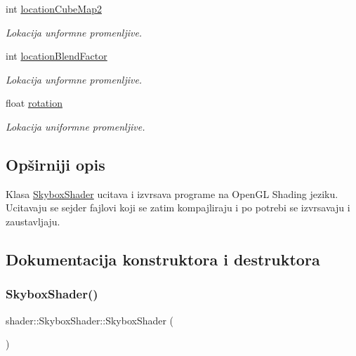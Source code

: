 \begin{DoxyCompactItemize}
int \hyperlink{classshader_1_1SkyboxShader_a011fc4476645aae62b9ae6e64faead3a}{location\+Cube\+Map2}
\begin{DoxyCompactList}\small\item\em Lokacija unformne promenljive. \end{DoxyCompactList}\item 
int \hyperlink{classshader_1_1SkyboxShader_a5f21030a22bd04c0b5a3018d5175b881}{location\+Blend\+Factor}
\begin{DoxyCompactList}\small\item\em Lokacija unformne promenljive. \end{DoxyCompactList}\item 
float \hyperlink{classshader_1_1SkyboxShader_a9e6ac7d8bed0467c3aa3b77f0fe80401}{rotation}
\begin{DoxyCompactList}\small\item\em Lokacija uniformne promenljive. \end{DoxyCompactList}\end{DoxyCompactItemize}


\subsection{Opširniji opis}
Klasa \hyperlink{classshader_1_1SkyboxShader}{Skybox\+Shader} ucitava i izvrsava programe na Open\+GL Shading jeziku. Ucitavaju se sejder fajlovi koji se zatim kompajliraju i po potrebi se izvrsavaju i zaustavljaju. 

\subsection{Dokumentacija konstruktora i destruktora}
\mbox{\label{classshader_1_1SkyboxShader_a88e79167a010f126f34b7948187a2fb0}} 
\subsubsection{\texorpdfstring{Skybox\+Shader()}{SkyboxShader()}}
{\footnotesize\ttfamily shader\+::\+Skybox\+Shader\+::\+Skybox\+Shader (\begin{DoxyParamCaption}{ }\end{DoxyParamCaption})}



